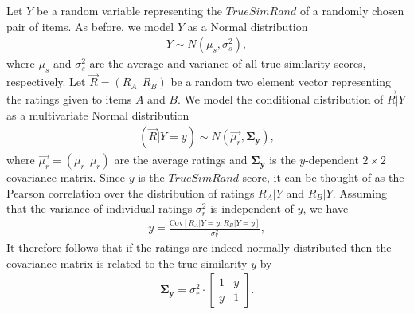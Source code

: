 \documentclass[11pt]{article}
\newcommand{\Cov}{\mathrm{Cov}}
\begin{document}
Let $Y$ be a random variable representing the $TrueSimRand$ of a randomly chosen
pair of items. As before, we model $Y$ as a Normal distribution
\begin{align}
Y \sim N(\mu_s, \sigma_s^2),
\end{align}
where $\mu_s$ and $\sigma_s^2$ are the average and variance of all true
similarity scores, respectively. Let $\vec{R} = \left(R_A~~R_B\right)$ be a
random two element vector representing the ratings given to items $A$ and $B$.
We model the conditional distribution of $\vec{R} | Y$ as a multivariate Normal
distribution
\begin{align}
(\vec{R} | Y=y) \sim N(\vec{\mu_r}, \mathbf{\Sigma_y}),
\end{align}
where $\vec{\mu_r} = (\mu_r~~\mu_r)$ are the average ratings and
$\mathbf{\Sigma_y}$ is the $y$-dependent $2\times2$ covariance matrix.  Since
$y$ is the $TrueSimRand$ score, it can be thought of as the Pearson correlation
over the distribution of ratings $R_A | Y$ and $R_B | Y$. Assuming that the
variance of individual ratings $\sigma_r^2$ is independent of $y$, we have 
\begin{align}
y = \frac{\Cov{\left[R_A | Y=y , R_B | Y=y\right]}}{\sigma_r^2},
\end{align}
It therefore follows that if the ratings are indeed normally distributed 
then the covariance matrix is related to the true similarity $y$ by
\begin{align}
\mathbf{\Sigma_y} = \sigma_r^2 \cdot
\left[ \begin{array}{cc}  1 & y \\ y & 1 \end{array} \right].
\end{align}
\end{document}
